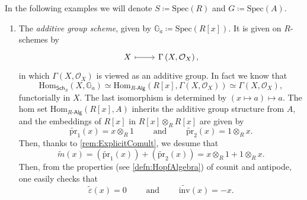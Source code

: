 \begin{ex}\label{ex:AffineGroupSchemesExamples}
	In the following examples we will denote $S \coloneqq \mathrm{Spec}(R)$
	and $G \coloneqq \mathrm{Spec}(A)$.\nopagebreak[4]
	\begin{enumerate}
		\item \label{ex:AdditiveGroupScheme}
		The {\em additive group scheme}, given by 
			$\mathbb{G}_a \coloneqq \mathrm{Spec}(R[x])$.
			It is given on $R$-schemes by
			\begin{equation*}
			\begin{tikzcd}[row sep = 0ex
				,/tikz/column 1/.append style={anchor=base east}
				,/tikz/column 2/.append style={anchor=base west}]
				X \arrow[r, "", mapsto] & 
				\Gamma \left( X , \mathcal{O}_{ X } \right)
			,\end{tikzcd}
			\end{equation*} 
			in which $\Gamma \left( X , \mathcal{O}_{ X } \right)$ is viewed
			as an additive group.
			In fact	we know that
			\begin{equation*}
			\mathrm{Hom}_{\mathsf{Sch}_S} \left( X, \mathbb{G}_a \right) \simeq
			\mathrm{Hom}_{R \text{-}\mathsf{Alg}} 
			\left( R[x], \Gamma \left( X , \mathcal{O}_{ X } \right) \right) \simeq
			\Gamma \left( X , \mathcal{O}_{ X } \right)
			,\end{equation*} 
			functorially in $X$.
			The last isomorphism is determined by 
			$(x \mapsto a) \mapsto a$.
			The hom set 
			$\mathrm{Hom}_{R \text{-}\mathsf{Alg}} \left( R[x], A \right)$
			inherits the additive group structure from $A$, and the embeddings
			of $R[x]$ in $R[x] \otimes_R R[x]$ are given by
			\begin{equation*}
				\widetilde{\mathrm{pr}}_1(x) = x \otimes_R 1
				\qquad \text{ and } \qquad
				\widetilde{\mathrm{pr}}_2(x) = 1 \otimes_R x
			.\end{equation*} 
			Then, thanks to \cref{rem:ExplicitComult},
			we desume that
			\begin{equation*}
				\widetilde{m}(x) =
				\left( \widetilde{\mathrm{pr}}_1(x) \right) +
				\left( \widetilde{\mathrm{pr}}_2(x) \right) =
				x \otimes_R 1 + 1 \otimes_R x
			.\end{equation*} 
			Then, from the properties (see \cref{defn:HopfAlgebra})
			of counit and antipode, one easily checks that 
			\begin{equation*}
				\widetilde{\varepsilon}(x) = 0
				\qquad \text{ and } \qquad
				\widetilde{\mathrm{inv}}(x) = -x
			.\end{equation*} 



\end{enumerate}
\end{ex}
